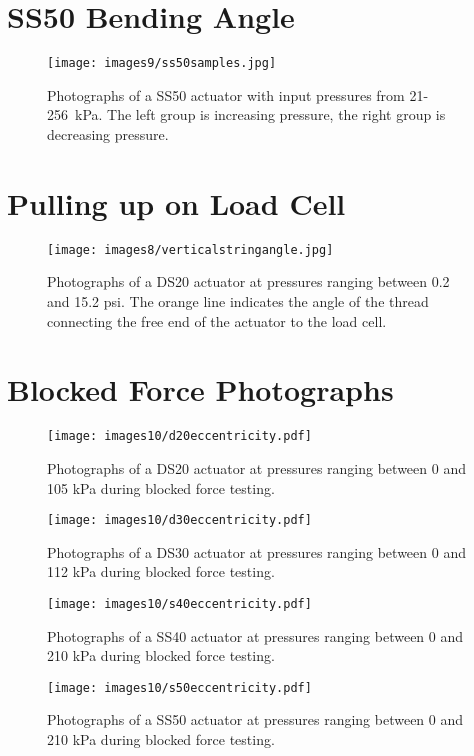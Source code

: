 \clearpage
\chapter{SS50 Bending Angle}
\label{appendix:s50all}
\begin{figure}[ht]
    \centering
     \texttt{[image: images9/ss50samples.jpg]}
    \caption{Photographs of a SS50 actuator with input pressures from 21-256~kPa. The left group is increasing pressure, the right group is decreasing pressure.}
    \label{fig:ss50samples}
\end{figure}

\chapter{Pulling up on Load Cell}
\label{appendix:pullinguploadcell}

\begin{figure}[ht]
    \centering
     \texttt{[image: images8/verticalstringangle.jpg]}
    \caption{Photographs of a DS20 actuator at pressures ranging between 0.2 and 15.2 psi. The orange line indicates the angle of the thread connecting the free end of the actuator to the load cell.}
    \label{fig:verticalstringangle}
\end{figure}

\chapter{Blocked Force Photographs}
\label{appendix:bf}

\begin{figure}[ht]
    \centering
     \texttt{[image: images10/d20eccentricity.pdf]}
    \caption{Photographs of a DS20 actuator at pressures ranging between 0 and 105 kPa during blocked force testing.}
\end{figure}

\begin{figure}[ht]
    \centering
     \texttt{[image: images10/d30eccentricity.pdf]}
    \caption{Photographs of a DS30 actuator at pressures ranging between 0 and 112 kPa during blocked force testing.}
\end{figure}


\begin{figure}[ht]
    \centering
     \texttt{[image: images10/s40eccentricity.pdf]}
    \caption{Photographs of a SS40 actuator at pressures ranging between 0 and 210 kPa during blocked force testing.}
\end{figure}


\begin{figure}[ht]
    \centering
     \texttt{[image: images10/s50eccentricity.pdf]}
    \caption{Photographs of a SS50 actuator at pressures ranging between 0 and 210 kPa during blocked force testing.}
\end{figure}